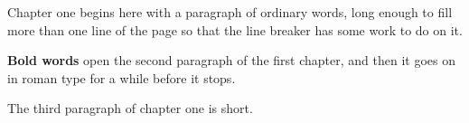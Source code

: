 Chapter one begins here with a paragraph of ordinary words, long enough
to fill more than one line of the page so that the line breaker has some
work to do on it.

{\bf Bold words} open the second paragraph of the first chapter, and
then it goes on in roman type for a while before it stops.

The third paragraph of chapter one is short.

